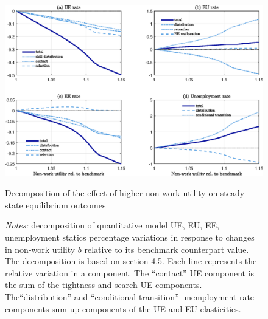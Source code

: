 \documentclass[12pt]{article} %
\theoremstyle{plain}
\theoremstyle{definition}
\begin{document}
	\begin{figure}[!h]
		\centering
		\includegraphics[width = 6.5in]{Figure_6.eps} 
		\caption{Decomposition of the effect of higher non-work utility on steady-state equilibrium outcomes}
		\label{fig:fig_7}
		\caption*{\footnotesize{\textit{Notes:} decomposition of quantitative model UE, EU, EE, unemployment statics percentage variations in response to changes in non-work utility $b$ relative to its benchmark counterpart value. The decomposition is based on section 4.5. Each line represents the relative variation in a component. The ``contact'' UE component is the sum of the tightness and search UE components. The``distribution'' and ``conditional-transition'' unemployment-rate components sum up components of the UE and EU elasticities.}}
	\end{figure}
	
\end{document}
